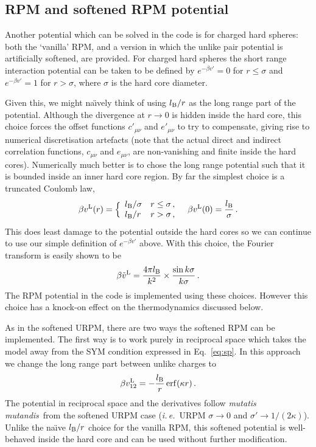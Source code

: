 \documentclass[12pt,a4paper]{article}
\DeclareMathOperator{\erf}{erf}
\newcommand{\latin}[1]{\emph{#1}}
\newcommand{\ie}{\latin{i.\,e.}}
\newcommand{\mutmut}{\latin{mutatis mutandis}}
\newcommand{\lr}{^{\mathrm{L}}}
\newcommand{\Eqref}[1]{Eq.~\eqref{#1}}
\begin{document}
\subsection{RPM and softened RPM potential}
\label{sec:softRPM}
%
Another potential which can be solved in the code is for charged hard
spheres: both the `vanilla' RPM, and a version in which the unlike
pair potential is artificially softened, are provided.  For charged
hard spheres the short range interaction potential can be taken to be
defined by $e^{-\beta v'}=0$ for $r\le\sigma$ and $e^{-\beta v'}=1$
for $r>\sigma$, where $\sigma$ is the hard core diameter.

Given this, we might na\"\i{}vely think of using $l_{\mathrm{B}}/r$ as the long
range part of the potential.  Although the divergence at $r\to0$ is
hidden inside the hard core, this choice forces the offset functions
$c'_{\mu\nu}$ and $e'_{\mu\nu}$ to try to compensate, giving rise to
numerical discretisation artefacts (note that the actual direct and
indirect correlation functions, $c_{\mu\nu}$ and $e_{\mu\nu}$, are
non-vanishing and finite inside the hard cores).  Numerically much
better is to chose the long range potential such that it is bounded
inside an inner hard core region.  By far the simplest choice is a
truncated Coulomb law,
%
\begin{equation}
  \beta v\lr(r)=\Bigl\{\begin{array}{ll}
  \lB/\sigma & r\le\sigma\,,\\
  \lB/r & r > \sigma\,,
  \end{array}\quad \beta v\lr(0)=\frac{\lB}{\sigma}\,.\label{eq:rpmhc}
\end{equation}
%
This does least damage to the potential outside the hard cores so we
can continue to use our simple definition of $e^{-\beta v'}$ above.
With this choice, the Fourier transform is easily shown to be
%
\begin{equation}
  \beta {\tilde v}\lr=\frac{4\pi\lB}{k^2}\times\frac{\sin k\sigma}{k\sigma}\,.
\end{equation}
%
The RPM potential in the code is implemented using these
choices. However this choice has a knock-on effect on the
thermodynamics discussed below.

As in the softened URPM, there are two ways the softened RPM can be
implemented.  The first way is to work purely in reciprocal space
which takes the model away from the SYM condition expressed in
\Eqref{eq:sp}.  In this approach we change the long range part between
unlike charges to
%
\begin{equation}
\beta v_{12}\lr=-\frac{\lB}{r} \erf(\kappa r)\,.
\end{equation}
%
The potential in reciprocal space and the derivatives follow
\mutmut\ from the softened URPM case (\ie\ URPM $\sigma\to0$ and
$\sigma'\to1/(2\kappa)$).  Unlike the na\"\i{}ve $l_{\mathrm{B}}/r$ choice for
the vanilla RPM, this softened potential is well-behaved inside the
hard core and can be used without further modification.
  
\end{document}

